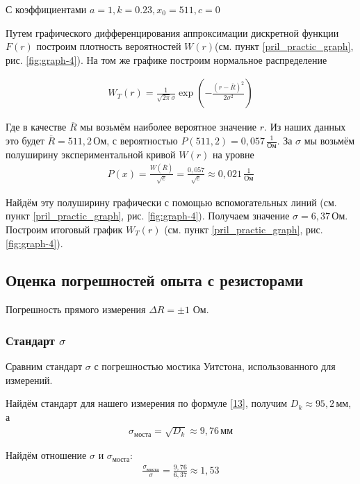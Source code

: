 С коэффициентами $ a = 1, k = 0.23, x_0 = 511, c = 0 $

Путем графического дифференцирования аппроксимации дискретной функции $F(r)$ построим плотность вероятностей $W(r)$(см. пункт \ref{pril_practic_graph}, рис. \ref{fig:graph-4}). На том же графике построим нормальное распределение

\begin{align}
	W_T(r) = \frac{1}{\sqrt{2 \pi} \sigma} \exp \left(- \frac{(r - \overline{R})^2}{2 \sigma^2}\right)
\end{align}

Где в качестве $\overline{R}$ мы возьмём наиболее вероятное значение $r$. Из наших данных это будет $\overline{R} = 511,2\, \text{Ом}$, с вероятностью $P(511,2) = 0,057 \, \frac{1}{\text{Ом}}$. За $\sigma$ мы возьмём полуширину экспериментальной кривой $W(r)$ на уровне 
\begin{align*}
		P(x) = \frac{W(\overline{R})}{\sqrt{e}} = \frac{0,057}{\sqrt{e}} \approx 0,021\, \frac{1}{\text{Ом}}
\end{align*}

Найдём эту полуширину графически с помощью вспомогательных линий (см. пункт \ref{pril_practic_graph}, рис. \ref{fig:graph-4}). Получаем значение $\sigma = 6,37 \, \text{Ом}$. Построим итоговый график $W_T(r)$ (см. пункт \ref{pril_practic_graph}, рис. \ref{fig:graph-4}). 

\subsection{Оценка погрешностей опыта с резисторами}

Погрешность прямого измерения $\Delta R = \pm 1 \text{ Ом}$.

\subsubsection{Стандарт $\sigma$}

Сравним стандарт $\sigma$ с погрешностью мостика Уитстона, использованного для измерений. 

Найдём стандарт для нашего измерения по формуле \eqref{13}, получим $D_k \approx 95,2 \, \text{мм}$, а
\begin{align*}
	\sigma_{\text{моста}} = \sqrt{D_k} \approx 9,76 \, \text{мм}
\end{align*}

Найдём отношение $\sigma$ и $\sigma_{\text{моста}}$:
\begin{align*}
	\frac{\sigma_{\text{моста}}}{\sigma} = \frac{9,76}{6,37} \approx 1,53
\end{align*}

